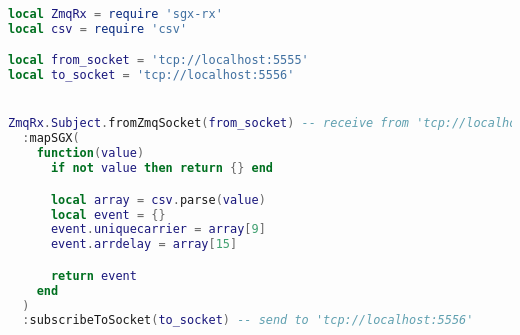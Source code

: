 \begin{lstlisting}[language=LUA,caption={Process pipeline with Zmq-RxLua using SGX: mapper.},label=rx-processing-sgx-map-csv-to-event]
local ZmqRx = require 'sgx-rx'
local csv = require 'csv'

local from_socket = 'tcp://localhost:5555'
local to_socket = 'tcp://localhost:5556'


ZmqRx.Subject.fromZmqSocket(from_socket) -- receive from 'tcp://localhost:5555'
  :mapSGX(
    function(value)
      if not value then return {} end

      local array = csv.parse(value)
      local event = {}
      event.uniquecarrier = array[9]
      event.arrdelay = array[15]

      return event
    end
  )
  :subscribeToSocket(to_socket) -- send to 'tcp://localhost:5556'
\end{lstlisting}
